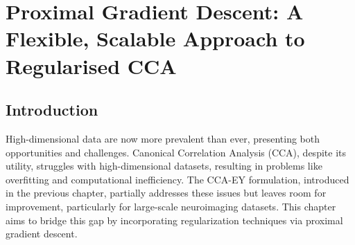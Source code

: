 \chapter{Proximal Gradient Descent: A Flexible, Scalable Approach to Regularised CCA}
\label{ch:proximal-gradient-descent}
\minitoc





\section{Introduction}

High-dimensional data are now more prevalent than ever, presenting both opportunities and challenges.
Canonical Correlation Analysis (CCA), despite its utility, struggles with high-dimensional datasets, resulting in problems like overfitting and computational inefficiency.
The CCA-EY formulation, introduced in the previous chapter, partially addresses these issues but leaves room for improvement, particularly for large-scale neuroimaging datasets.
This chapter aims to bridge this gap by incorporating regularization techniques via proximal gradient descent.



